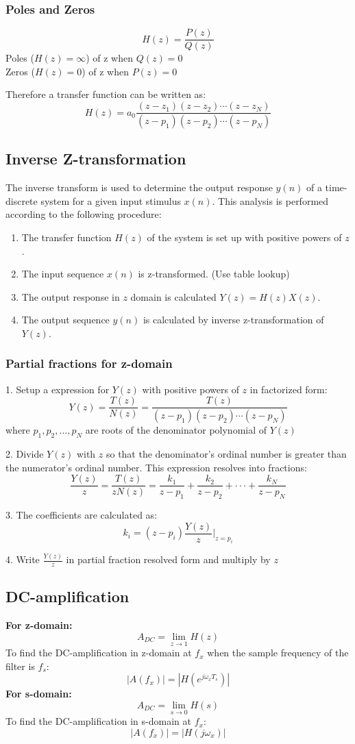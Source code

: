 \subsubsection{Poles and Zeros}
$$H(z)=\frac{P(z)}{Q(z)}$$
Poles ($H(z)=\infty$) of z when $Q(z)=0$\\
Zeros ($H(z)=0$) of z when $P(z)=0$

Therefore a transfer function can be written as:
$$H(z)=a_0\frac{(z-z_1)(z-z_2)\cdots(z-z_N)}{(z-p_1)(z-p_2)\cdots(z-p_N)}$$

\subsection{Inverse Z-transformation}
The inverse transform is used to determine the output response $y(n)$ of a time-discrete system for a given input stimulus $x(n)$. This analysis is performed according to the following procedure:
\begin{enumerate}
  \item The transfer function $H(z)$ of the system is set up with positive powers of $z$.
  \item The input sequence $x(n)$ is z-transformed. (Use table lookup)
  \item The output response in $z$ domain is calculated $Y(z)=H(z)X(z)$.
  \item The output sequence $y(n)$ is calculated by inverse z-transformation of $Y(z)$.
\end{enumerate}

\subsubsection{Partial fractions for z-domain}
1. Setup a expression for $Y(z)$ with positive powers of $z$ in factorized form:
$$Y(z)=\frac{T(z)}{N(z)}=\frac{T(z)}{(z-p_1)(z-p_2)\cdots(z-p_N)}$$
where $p_1,p_2,\dots,p_N$ are roots of the denominator polynomial of $Y(z)$

2. Divide $Y(z)$ with $z$ so that the denominator's ordinal number is greater than the numerator's ordinal number. This expression resolves into fractions:
$$\frac{Y(z)}{z}=\frac{T(z)}{z N(z)}=\frac{k_{1}}{z-p_{1}}+\frac{k_{2}}{z-p_{2}}+\cdot\cdot\cdot+\frac{k_{N}}{z-p_{N}}$$

3. The coefficients are calculated as:
$$k_{i}=(z-p_{i})\frac{Y(z)}{z}\vert_{z=p_{i}}$$

4. Write $\frac{Y(z)}{z}$ in partial fraction resolved form and multiply by $z$
\subsection{DC-amplification}
\textbf{For z-domain:}
$$A_{DC}=\lim_{z\to 1}H(z)$$
To find the DC-amplification in z-domain at $f_x$ when the sample frequency of the filter is $f_s$:
$$|A(f_x)|=|H(e^{j\omega_x T_s})|$$
\textbf{For s-domain:}
$$A_{DC}=\lim_{s\to 0}H(s)$$
To find the DC-amplification in s-domain at $f_x$:
$$|A(f_x)|=|H(j\omega_x)|$$

